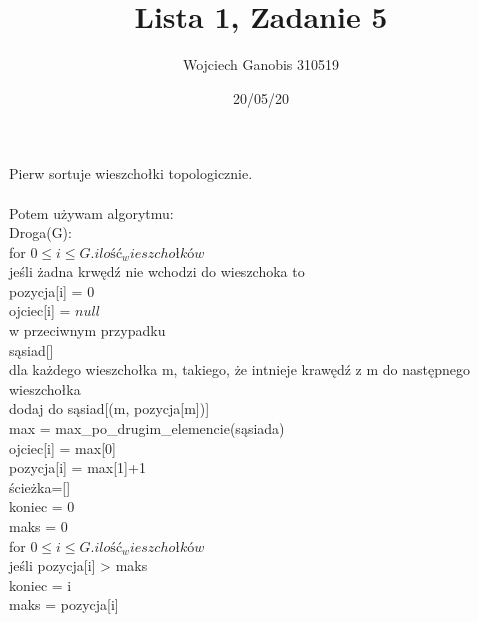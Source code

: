 \documentclass{article}
\title{Lista 1, Zadanie 5}
\author{Wojciech Ganobis 310519}
\date{20/05/20}
\newcommand\tab[1][1cm]{\hspace*{#1}}
\begin{document}
\maketitle
Pierw sortuje wieszchołki topologicznie.\\\\
Potem używam algorytmu:\\
Droga(G):\\
\tab for $0\leq i \leq G.ilość_wieszchołków$\\
\tab\tab jeśli żadna krwędź nie wchodzi do wieszchoka to\\
\tab\tab\tab pozycja[i] = 0\\
\tab\tab\tab ojciec[i] = $null$\\
\tab\tab w przeciwnym przypadku\\
\tab\tab\tab sąsiad[]\\
\tab\tab\tab dla każdego wieszchołka m, takiego, że intnieje krawędź z m do następnego wieszchołka\\
\tab\tab\tab\tab dodaj do sąsiad[(m, pozycja[m])]\\
\tab\tab\tab max = max\_po\_drugim\_elemencie(sąsiada)\\
\tab\tab\tab ojciec[i] = max[0]\\
\tab\tab\tab pozycja[i] = max[1]+1\\
\tab ścieżka=[]\\
\tab koniec = 0\\
\tab maks  = 0\\
\tab for $0 \leq i \leq G.ilość_wieszchołków$\\
\tab\tab jeśli pozycja[i] > maks\\
\tab\tab\tab koniec = i\\
\tab\tab\tab maks = pozycja[i]\\\\
\end{document}
